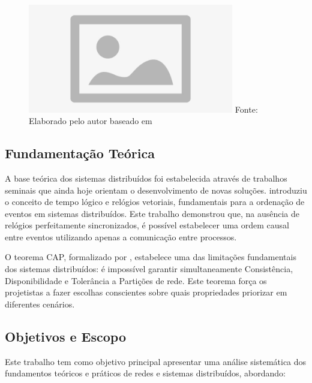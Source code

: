 \begin{figure}[H]
\centering
{}
\includegraphics[width=0.8\textwidth]{figure/placeholder.jpg}
\label{fig:arquitetura_distribuida}
{\fontsize{10pt}{\baselineskip}\selectfont
  Fonte: Elaborado pelo autor baseado em }
\end{figure}

\subsection{Fundamentação Teórica}

A base teórica dos sistemas distribuídos foi estabelecida através de trabalhos seminais que ainda hoje orientam o desenvolvimento de novas soluções.  introduziu o conceito de tempo lógico e relógios vetoriais, fundamentais para a ordenação de eventos em sistemas distribuídos. Este trabalho demonstrou que, na ausência de relógios perfeitamente sincronizados, é possível estabelecer uma ordem causal entre eventos utilizando apenas a comunicação entre processos.

O teorema CAP, formalizado por , estabelece uma das limitações fundamentais dos sistemas distribuídos: é impossível garantir simultaneamente Consistência, Disponibilidade e Tolerância a Partições de rede. Este teorema força os projetistas a fazer escolhas conscientes sobre quais propriedades priorizar em diferentes cenários.

\subsection{Objetivos e Escopo}

Este trabalho tem como objetivo principal apresentar uma análise sistemática dos fundamentos teóricos e práticos de redes e sistemas distribuídos, abordando:

